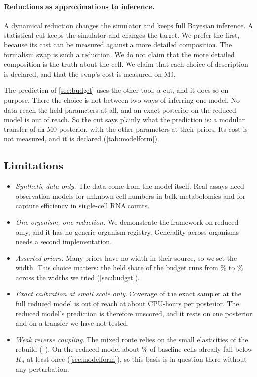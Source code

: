 \paragraph{Reductions as approximations to inference.} A dynamical reduction changes
the simulator and keeps full Bayesian inference. A statistical cut keeps the
simulator and changes the target. We prefer the first, because its cost can be
measured against a more detailed composition. The formalism swap is such a reduction.
We do not claim that the more detailed composition is the truth about the cell. We claim that each choice of description is declared, and that the swap's cost is measured on M0.

The prediction of \cref{sec:budget} uses the other tool, a cut, and it does so on
purpose. There the choice is not between two ways of inferring one model. No data
reach the held parameters at all, and an exact posterior on the reduced model is out of
reach. So the cut says plainly what the prediction is: a modular transfer of an M0
posterior, with the other parameters at their priors. Its cost is not measured, and it
is declared (\cref{tab:modelform}).

\subsection{Limitations}

\begin{itemize}
  \item \emph{Synthetic data only.} The data come from the model itself. Real
  assays need observation models for unknown cell numbers in bulk metabolomics and
  for capture efficiency in single-cell RNA counts.
  \item \emph{One organism, one reduction.} We demonstrate the framework on reduced
  \syn{} only, and it has no generic organism registry. Generality across organisms needs
  a second implementation.
  \item \emph{Asserted priors.} Many priors have no width in their source, so we set
  the width. This choice matters: the held share of the budget runs from
  \% to \% across the widths we tried
  (\cref{sec:budget}).
  \item \emph{Exact calibration at small scale only.} Coverage of the exact sampler
  at the full reduced model is out of reach at about  CPU-hours per
  posterior. The reduced model's prediction is therefore unscored, and it rests on one
  posterior and on a transfer we have not tested.
  \item \emph{Weak reverse coupling.} The mixed route relies on the small
  elasticities of the rebuild (--). On the reduced model about \% of baseline cells already fall below $K_d$ at least once (\cref{sec:modelform}), so this basis is in question there without any perturbation.
\end{itemize}

